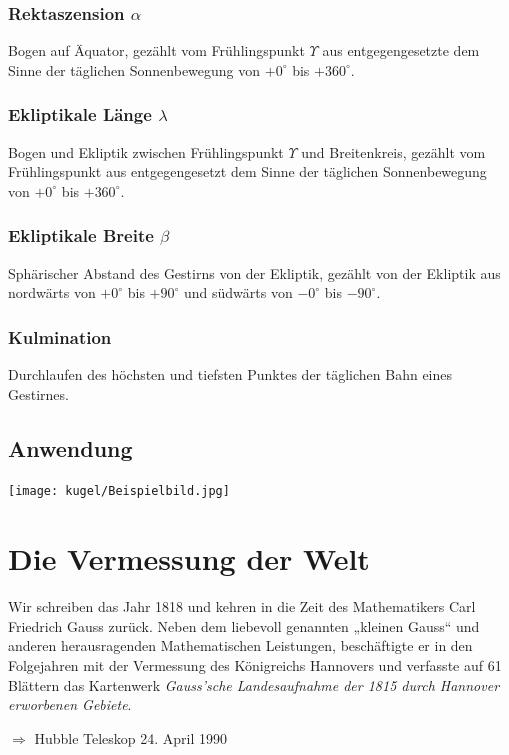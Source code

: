 \begin{refsection}

\subsubsection{Rektaszension $\alpha$}
Bogen auf Äquator, gezählt vom Frühlingspunkt $\Upsilon$ aus entgegengesetzte dem Sinne der täglichen Sonnenbewegung von $+0^{\circ}$ bis $+360^{\circ}$.

\subsubsection{Ekliptikale Länge $\lambda$}
Bogen und Ekliptik zwischen Frühlingspunkt $\Upsilon$ und Breitenkreis, gezählt vom Frühlingspunkt aus entgegengesetzt dem Sinne der täglichen Sonnenbewegung von $+0^{\circ}$ bis $+360^{\circ}$.

\subsubsection{Ekliptikale Breite $\beta$}
Sphärischer Abstand des Gestirns von der Ekliptik, gezählt von der Ekliptik aus nordwärts von $+0^{\circ}$ bis $+90^{\circ}$ und südwärts von $-0^{\circ}$ bis $-90^{\circ}$.

\subsubsection{Kulmination}
Durchlaufen des höchsten und tiefsten Punktes der täglichen Bahn eines Gestirnes.


\subsection{Anwendung}





\begin{center}
        \texttt{[image: kugel/Beispielbild.jpg]}
\end{center}





\section{Die Vermessung der Welt}
Wir schreiben das Jahr 1818 und kehren in die Zeit des Mathematikers Carl Friedrich Gauss zurück. Neben dem liebevoll genannten „kleinen Gauss“ und anderen herausragenden Mathematischen Leistungen, beschäftigte er in den Folgejahren mit der Vermessung des Königreichs Hannovers und verfasste auf 61 Blättern das Kartenwerk \textit{Gauss’sche Landesaufnahme der 1815 durch Hannover erworbenen Gebiete}.
\cite{skript:tabea}


$\Rightarrow$
Hubble Teleskop 
24. April 1990




\printbibliography[heading=subbibliography]
\end{refsection}



